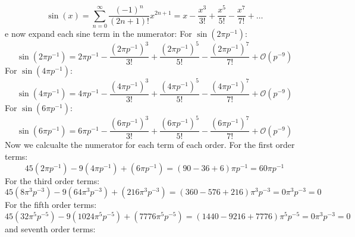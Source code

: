 \begin{equation}
	\sin(x) = \sum_{n=0}^{\infty} \frac{(-1)^n}{(2n + 1)!}x^{2n+1} = x - \frac{x^3}{3!} + \frac{x^5}{5!} - \frac{x^7}{7!} + \ldots \tag{30}
\end{equation}
e now expand each sine term in the numerator:
For $\sin(2\pi p^{-1})$:
\begin{equation}
	\sin(2\pi p^{-1}) = 2\pi p^{-1} - \frac{(2\pi p^{-1})^3}{3!} + \frac{(2\pi p^{-1})^5}{5!} - \frac{(2\pi p^{-1})^7}{7!} + \mathcal{O}(p^{-9})
\end{equation}
For $\sin(4\pi p^{-1})$:
\begin{equation}
	\sin(4\pi p^{-1}) = 4\pi p^{-1} - \frac{(4\pi p^{-1})^3}{3!} + \frac{(4\pi p^{-1})^5}{5!} - \frac{(4\pi p^{-1})^7}{7!} + \mathcal{O}(p^{-9})
\end{equation}
For $\sin(6\pi p^{-1})$:
\begin{equation}
	\sin(6\pi p^{-1}) = 6\pi p^{-1} - \frac{(6\pi p^{-1})^3}{3!} + \frac{(6\pi p^{-1})^5}{5!} - \frac{(6\pi p^{-1})^7}{7!} + \mathcal{O}(p^{-9})
\end{equation}
Now we calcualte the numerator for each term of each order.\newline
For the first order terms:
\begin{equation}
	45\left( 2 \pi p^{-1}\right) - 9\left(4 \pi p^{-1}\right) + \left(6 \pi p^{-1}\right) = (90 - 36 + 6) \pi p^{-1} = 60 \pi p^{-1}
\end{equation}
For the third order terms:
\begin{equation}
	45\left( 8 \pi^3 p^{-3}\right) - 9\left(64 \pi^3 p^{-3}\right) + \left(216 \pi^3 p^{-3}\right) = (360 - 576 + 216) \pi^3 p^{-3} = 0 \pi^3 p^{-3} = 0
\end{equation}
For the fifth order terms:
\begin{equation}
	45\left( 32 \pi^5 p^{-5}\right) - 9\left(1024 \pi^5 p^{-5}\right) + \left(7776 \pi^5 p^{-5}\right) = (1440 - 9216 + 7776) \pi^5 p^{-5} = 0 \pi^3 p^{-3} = 0
\end{equation}
and seventh order terms:
